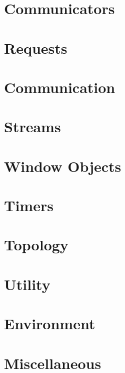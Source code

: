 \documentclass{article}
\begin{document}
\section{Communicators}


\section{Requests}


\section{Communication}



\section{Streams}



\section{Window Objects}


\section{Timers}


\section{Topology}



\section{Utility}

 

\section{Environment}


\newread\testfile
\openin{}
\ifeof\testfile\else
\section{Miscellaneous}

\fi
\closein\testfile
\end{document}

